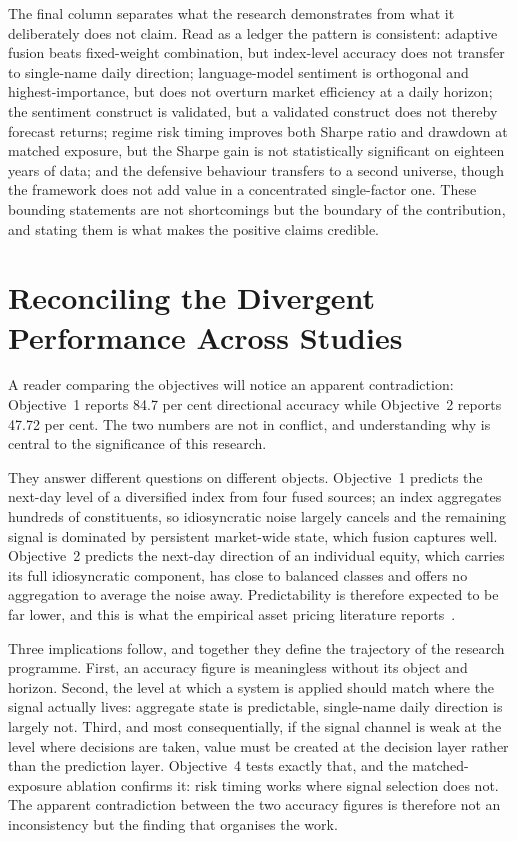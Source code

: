 The final column separates what the research demonstrates from what it deliberately
does not claim. Read as a ledger the pattern is consistent: adaptive fusion beats
fixed-weight combination, but index-level accuracy does not transfer to single-name
daily direction; language-model sentiment is orthogonal and highest-importance, but
does not overturn market efficiency at a daily horizon; the sentiment construct is
validated, but a validated construct does not thereby forecast returns; regime risk
timing improves both Sharpe ratio and drawdown at matched exposure, but the Sharpe
gain is not statistically significant on eighteen years of data; and the defensive
behaviour transfers to a second universe, though the framework does not add value in
a concentrated single-factor one. These bounding statements are not shortcomings but
the boundary of the contribution, and stating them is what makes the positive claims
credible.

\section{Reconciling the Divergent Performance Across Studies}

A reader comparing the objectives will notice an apparent contradiction: Objective~1
reports 84.7 per cent directional accuracy while Objective~2 reports 47.72 per cent. The
two numbers are not in conflict, and understanding why is central to the significance of
this research.

They answer different questions on different objects. Objective~1 predicts the next-day
level of a diversified index from four fused sources; an index aggregates hundreds of
constituents, so idiosyncratic noise largely cancels and the remaining signal is dominated
by persistent market-wide state, which fusion captures well. Objective~2 predicts the
next-day direction of an individual equity, which carries its full idiosyncratic
component, has close to balanced classes and offers no aggregation to average the noise
away. Predictability is therefore expected to be far lower, and this is what the empirical
asset pricing literature reports~\cite{gu2020}.

Three implications follow, and together they define the trajectory of the research
programme. First, an accuracy figure is meaningless without its object and horizon.
Second, the level at which a system is applied should match where the signal actually
lives: aggregate state is predictable, single-name daily direction is largely not. Third,
and most consequentially, if the signal channel is weak at the level where decisions are
taken, value must be created at the decision layer rather than the prediction layer.
Objective~4 tests exactly that, and the matched-exposure ablation confirms it: risk timing
works where signal selection does not. The apparent contradiction between the two accuracy
figures is therefore not an inconsistency but the finding that organises the work.

